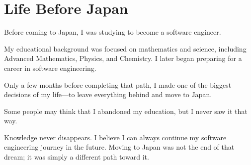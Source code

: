 \section{Life Before Japan}

Before coming to Japan, I was studying to become a software engineer.

My educational background was focused on mathematics and science, including Advanced Mathematics, Physics, and Chemistry. I later began preparing for a career in software engineering.

Only a few months before completing that path, I made one of the biggest decisions of my life—to leave everything behind and move to Japan.

Some people may think that I abandoned my education, but I never saw it that way.

Knowledge never disappears. I believe I can always continue my software engineering journey in the future. Moving to Japan was not the end of that dream; it was simply a different path toward it.